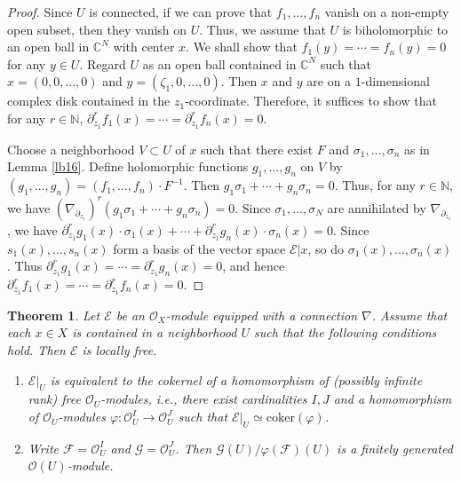 \documentclass[12pt,a4paper,notitlepage]{report}
\theoremstyle{definition}
\theoremstyle{plain}
\newtheorem{thm}[df]{Theorem}
\newcommand{\scr}{\mathscr}
\newcommand{\mbb}{\mathbb}
\numberwithin{equation}{section}
\begin{document}
\begin{proof}
	
Since $U$ is connected, if  we can prove that $f_1,\dots,f_n$ vanish on a non-empty open subset, then they vanish on $U$. Thus, we assume that $U$ is biholomorphic  to an open ball in $\mbb C^N$ with center $x$. We shall show that $f_1(y)=\cdots=f_n(y)=0$ for any $y\in U$. Regard $U$ as an open ball contained in $\mbb C^N$ such that $x=(0,0,\dots,0)$ and $y=(\zeta_1,0,\dots,0)$. Then $x$ and $y$ are on a $1$-dimensional complex disk contained in the $z_1$-coordinate. Therefore,  it suffices to show that for any $r\in\mbb N$, $\partial_{z_1}^rf_1(x)=\cdots=\partial_{z_1}^rf_n(x)=0$.

Choose a neighborhood $V\subset U$ of $x$ such that there exist $F$ and $\sigma_1,\dots,\sigma_n$ as in Lemma \ref{lb16}. Define holomorphic functions $g_1,\dots,g_n$ on $V$ by $(g_1,\dots,g_n)=(f_1,\dots,f_n)\cdot F^{-1}$. Then $g_1\sigma_1+\cdots+g_n\sigma_n=0$. Thus, for any $r\in\mbb N$, we have $(\nabla_{\partial_{z_1}})^r(g_1\sigma_1+\cdots+g_n\sigma_n)=0$. Since $\sigma_1,\dots,\sigma_N$ are annihilated by $\nabla_{\partial_{z_1}}$,  we have $\partial_{z_1}^rg_1(x)\cdot\sigma_1(x)+\cdots+\partial_{z_1}^rg_n(x)\cdot\sigma_n(x)=0$.  Since  $s_1(x),\dots,s_n(x)$ form a basis of the vector space $\scr E|x$, so do $\sigma_1(x),\dots,\sigma_n(x)$. Thus $\partial_{z_1}^rg_1(x)=\cdots=\partial_{z_1}^rg_n(x)=0$, and hence $\partial_{z_1}^rf_1(x)=\cdots=\partial_{z_1}^rf_n(x)=0$.
\end{proof}


\begin{thm}\label{lb66}
Let $\scr E$ be an $\scr O_X$-module equipped with a connection $\nabla$. Assume that  each $x\in X$ is contained in a neighborhood $U$ such that the following conditions hold. Then $\scr E$ is locally free.
\begin{enumerate}[label=(\alph*)]
\item $\scr E|_U$ is equivalent to the cokernel of a homomorphism of (possibly infinite rank) free $\scr O_U$-modules, i.e., there exist cardinalities $I,J$ and a homomorphism of $\scr O_U$-modules $\varphi:\scr O_U^I\rightarrow\scr O_U^J$  such that $\scr E|_U\simeq\mathrm{coker}(\varphi)$.
\item Write $\scr F=\scr O^I_U$ and $\scr G=\scr O^J_U$. Then $\scr G(U)/\varphi(\scr F)(U)$ is a finitely generated $\scr O(U)$-module. 
\end{enumerate}
\end{thm}
\end{document}
